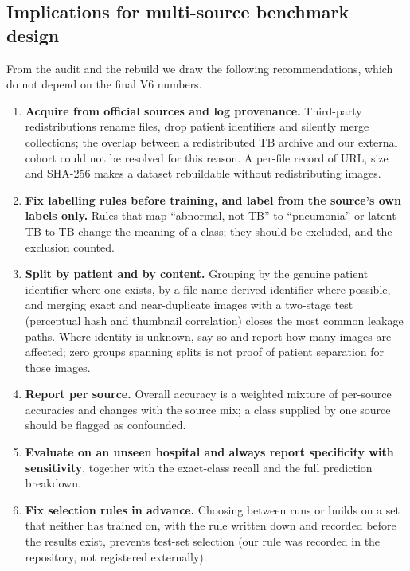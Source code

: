 \subsection{Implications for multi-source benchmark design}
From the audit and the rebuild we draw the following recommendations, which do not depend on the final V6 numbers.
\begin{enumerate}
\item \textbf{Acquire from official sources and log provenance.} Third-party redistributions rename files, drop patient identifiers and silently merge collections; the overlap between a redistributed TB archive and our external cohort could not be resolved for this reason. A per-file record of URL, size and SHA-256 makes a dataset rebuildable without redistributing images.
\item \textbf{Fix labelling rules before training, and label from the source's own labels only.} Rules that map ``abnormal, not TB'' to ``pneumonia'' or latent TB to TB change the meaning of a class; they should be excluded, and the exclusion counted.
\item \textbf{Split by patient and by content.} Grouping by the genuine patient identifier where one exists, by a file-name-derived identifier where possible, and merging exact and near-duplicate images with a two-stage test (perceptual hash and thumbnail correlation) closes the most common leakage paths. Where identity is unknown, say so and report how many images are affected; zero groups spanning splits is not proof of patient separation for those images.
\item \textbf{Report per source.} Overall accuracy is a weighted mixture of per-source accuracies and changes with the source mix; a class supplied by one source should be flagged as confounded.
\item \textbf{Evaluate on an unseen hospital and always report specificity with sensitivity}, together with the exact-class recall and the full prediction breakdown.
\item \textbf{Fix selection rules in advance.} Choosing between runs or builds on a set that neither has trained on, with the rule written down and recorded before the results exist, prevents test-set selection (our rule was recorded in the repository, not registered externally).
\end{enumerate}

